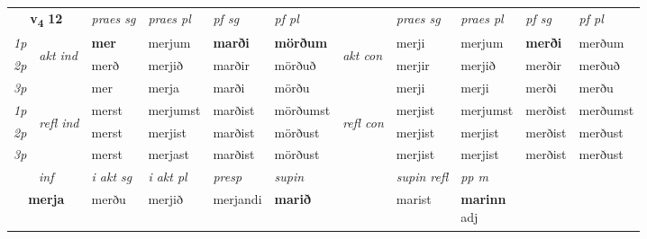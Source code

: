 \noindent
\begin{tabular}{lllllllllll} \toprule
\multicolumn{2}{c}{\textbf{v{\textsubscript{4}}} \Large{\textbf{12}}}  &  \textit{praes sg}  & \textit{praes pl}  &\textit{ pf sg} & \textit{pf pl} &  &  \textit{praes sg}  & \textit{praes pl}  & \textit{pf sg} & \textit{pf pl } \\*
	\cmidrule{3-6} \cmidrule{8-11}
 {\textit{1p}} & \multirow{3}{*}{\begin{turn}{90}\textit{akt ind}\end{turn}} & \textbf{mer} & merjum & \textbf{marði} & \textbf{mörðum} & \multirow{3}{*}{\begin{turn}{90}\textit{akt con}\end{turn}} &merji & merjum & \textbf{merði} & merðum\\*
 {\textit{2p}} &  &  merð  & merjið & marðir & mörðuð & & merjir & merjið & merðir & merðuð \\*
{\textit{3p}} &  & mer & merja & marði & mörðu & & merji & merji& merði & merðu \\*
\cmidrule{3-6} \cmidrule{8-11}
 {\textit{1p}} & \multirow{3}{*}{\begin{turn}{90}\textit{refl ind}\end{turn}}  & merst & merjumst & marðist & mörðumst & \multirow{3}{*}{\begin{turn}{90}\textit{refl con}\end{turn}}  &merjist & merjumst & merðist & merðumst \\*
 {\textit{2p}} &  & merst & merjist & marðist & mörðust & &merjist & merjist & merðist & merðust \\*
 {\textit{3p}}  & & merst & merjast & marðist & mörðust & & merjist & merjist& merðist & merðust \\*
\cmidrule{3-6} \cmidrule{8-11}

   \multicolumn{2}{c}{\textit{inf}}  & \textit{i akt sg} & \textit{i akt pl}   & \textit{presp} & \textit{supin} && \textit{supin refl} & \textit{pp m} \\*
  \multicolumn{2}{c}{\textbf{merja}} & merðu  & merjið   & merjandi &  \textbf{marið} && marist & \specialcell{\textbf{marinn} \\ adj\textbf{\textsubscript{}}} \\*
\end{tabular}

